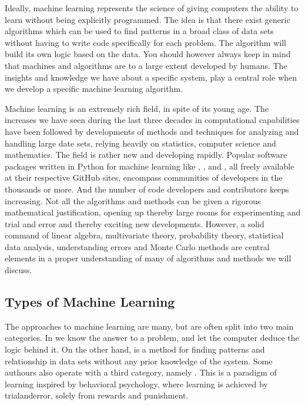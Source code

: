 \documentclass[letterpaper,10pt,english]{sphinxmanual}
\begin{document}
Ideally, machine learning represents the science of giving computers
the ability to learn without being explicitly programmed.  The idea is
that there exist generic algorithms which can be used to find patterns
in a broad class of data sets without having to write code
specifically for each problem. The algorithm will build its own logic
based on the data.  You should however always keep in mind that
machines and algorithms are to a large extent developed by humans. The
insights and knowledge we have about a specific system, play a central
role when we develop a specific machine learning algorithm.

Machine learning is an extremely rich field, in spite of its young
age. The increases we have seen during the last three decades in
computational capabilities have been followed by developments of
methods and techniques for analyzing and handling large date sets,
relying heavily on statistics, computer science and mathematics.  The
field is rather new and developing rapidly. Popular software packages
written in Python for machine learning like
,
,
 and , all
freely available at their respective GitHub sites, encompass
communities of developers in the thousands or more. And the number of
code developers and contributors keeps increasing. Not all the
algorithms and methods can be given a rigorous mathematical
justification, opening up thereby large rooms for experimenting and
trial and error and thereby exciting new developments.  However, a
solid command of linear algebra, multivariate theory, probability
theory, statistical data analysis, understanding errors and Monte
Carlo methods are central elements in a proper understanding of many
of algorithms and methods we will discuss.


\subsection{Types of Machine Learning}
\label{\detokenize{chapter3:types-of-machine-learning}}
The approaches to machine learning are many, but are often split into
two main categories.  In  we know the answer to a
problem, and let the computer deduce the logic behind it. On the other
hand,  is a method for finding patterns and
relationship in data sets without any prior knowledge of the system.
Some authours also operate with a third category, namely
. This is a paradigm of learning inspired by
behavioral psychology, where learning is achieved by trial\sphinxhyphen{}and\sphinxhyphen{}error,
solely from rewards and punishment.
\end{document}
